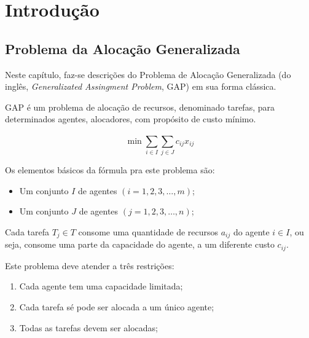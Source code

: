 \documentclass[portugues, brazil, a4paper,12pt]{article}
\begin{document}

\section{Introdução}
	\subsection{Problema da Alocação Generalizada}
		Neste capítulo, faz-se descrições do Problema de Alocação Generalizada (do inglês, \textit{Generalizated Assingment Problem}, GAP) em sua forma clássica.
	
		GAP é um problema de alocação de recursos, denominado tarefas, para determinados agentes, alocadores, com propósito de custo mínimo.

		$$\min \sum_{i \in I}^{} \sum_{j \in J}^{} c_{ij}x_{ij}$$

		Os elementos básicos da fórmula pra este problema são:

		\begin{itemize}
			\item Um conjunto $I$ de agentes $(i = 1, 2, 3, \ldots, m)$;
			
			\item Um conjunto $J$ de agentes $(j = 1, 2, 3, \ldots, n)$;
		\end{itemize}

		Cada tarefa $T_j \in T$ consome uma quantidade de recursos $a_{ij}$ do agente $i \in I$, ou seja, consome uma parte da capacidade do agente, a um diferente custo $c_{ij}$.
		
		Este problema deve atender a três restrições:
		
		\begin{enumerate}
			\item Cada agente tem uma capacidade limitada;
			
			\item Cada tarefa sé pode ser alocada a um único agente;
			
			\item Todas as tarefas devem ser alocadas;
		\end{enumerate}
		
\end{document}
